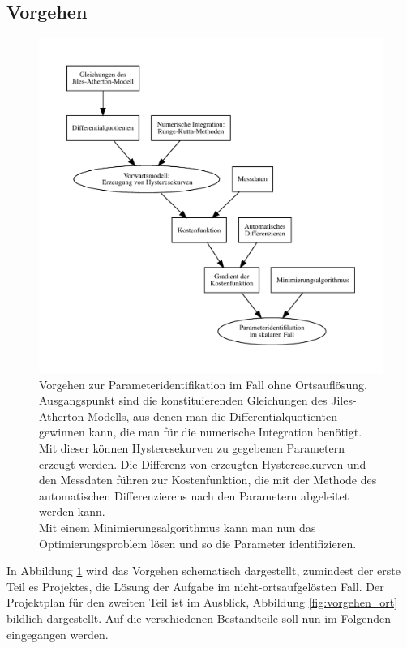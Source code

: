 \documentclass{scrartcl}
\begin{document}
\subsection{Vorgehen}
\begin{figure}
\caption{Vorgehen zur Parameteridentifikation im Fall ohne Ortsauflösung.\\Ausgangspunkt sind die konstituierenden Gleichungen des Jiles-Atherton-Modells, aus denen man die Differentialquotienten gewinnen kann, die man für die numerische Integration benötigt.\\
Mit dieser können Hysteresekurven zu gegebenen Parametern erzeugt werden. Die Differenz von erzeugten Hysteresekurven und den Messdaten führen zur Kostenfunktion, die mit der Methode des automatischen Differenzierens nach den Parametern abgeleitet werden kann.\\
Mit einem Minimierungsalgorithmus kann man nun das Optimierungsproblem lösen und so die Parameter identifizieren.}
\label{fig:vorgehen_skalar}

\includegraphics[width=\textwidth]{vorgehen.pdf}

\end{figure}
In Abbildung \ref{fig:vorgehen_skalar} wird das Vorgehen schematisch dargestellt, zumindest der erste Teil es Projektes, die Lösung der Aufgabe im nicht-ortsaufgelösten Fall. Der Projektplan für den zweiten Teil ist im Ausblick, Abbildung \ref{fig:vorgehen_ort} bildlich dargestellt. Auf die verschiedenen Bestandteile soll nun im Folgenden eingegangen werden.\\
\end{document}
